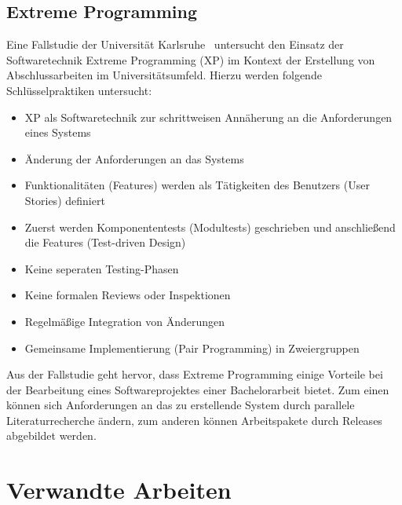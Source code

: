 \subsection*{Extreme Programming}
Eine Fallstudie der Universität Karlsruhe~\cite{muller_2001} untersucht den Einsatz der Softwaretechnik Extreme
Programming (XP) im Kontext der Erstellung von Abschlussarbeiten im Universitätsumfeld.
Hierzu werden folgende Schlüsselpraktiken untersucht:
\begin{itemize}
    \item XP als Softwaretechnik zur schrittweisen Annäherung an die Anforderungen eines Systems
    \item Änderung der Anforderungen an das Systems
    \item Funktionalitäten (Features) werden als Tätigkeiten des Benutzers (User Stories) definiert
    \item Zuerst werden Komponententests (Modultests) geschrieben und anschließend die Features (Test-driven Design)
    \item Keine seperaten Testing-Phasen
    \item Keine formalen Reviews oder Inspektionen
    \item Regelmäßige Integration von Änderungen
    \item Gemeinsame Implementierung (Pair Programming) in Zweiergruppen
\end{itemize}
Aus der Fallstudie geht hervor, dass Extreme Programming einige Vorteile bei der Bearbeitung eines Softwareprojektes
einer Bachelorarbeit bietet.
Zum einen können sich Anforderungen an das zu erstellende System durch parallele Literaturrecherche ändern, zum
anderen können Arbeitspakete durch Releases abgebildet werden.

\section{Verwandte Arbeiten}


